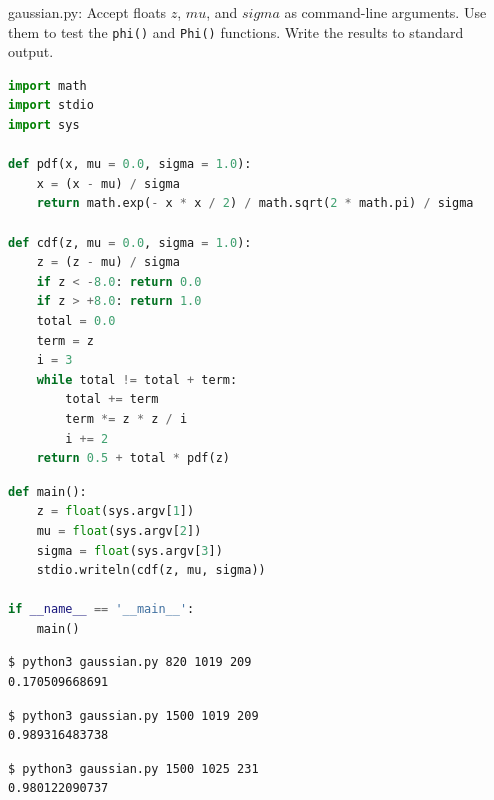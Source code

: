 \documentclass[8pt,a4paper,compress]{beamer}
\begin{document}
\begin{frame}[fragile]
\pause

\begin{framed}
\tiny gaussian.py: Accept floats $z$, $mu$, and $sigma$ as command-line arguments. Use them to test the \lstinline{phi()} and \lstinline{Phi()} functions. Write the results to standard output.
\end{framed}

\begin{lstlisting}[language=Python,style=focusin]
import math
import stdio
import sys

def pdf(x, mu = 0.0, sigma = 1.0):
    x = (x - mu) / sigma
    return math.exp(- x * x / 2) / math.sqrt(2 * math.pi) / sigma

def cdf(z, mu = 0.0, sigma = 1.0):
    z = (z - mu) / sigma
    if z < -8.0: return 0.0
    if z > +8.0: return 1.0
    total = 0.0
    term = z
    i = 3
    while total != total + term:
        total += term
        term *= z * z / i
        i += 2
    return 0.5 + total * pdf(z)
\end{lstlisting}
\end{frame}

\begin{frame}[fragile]
\pause

\begin{lstlisting}[language=Python,style=focusin]
def main():
    z = float(sys.argv[1])
    mu = float(sys.argv[2])
    sigma = float(sys.argv[3])
    stdio.writeln(cdf(z, mu, sigma))

if __name__ == '__main__':
    main()
\end{lstlisting}

\pause\smallskip

\begin{lstlisting}[language={},style=focusin]
$ python3 gaussian.py 820 1019 209
0.170509668691
\end{lstlisting}

\pause\smallskip

\begin{lstlisting}[language={},style=focusin]
$ python3 gaussian.py 1500 1019 209
0.989316483738
\end{lstlisting}

\pause\smallskip

\begin{lstlisting}[language={},style=focusin]
$ python3 gaussian.py 1500 1025 231
0.980122090737
\end{lstlisting}
\end{frame}
\end{document}
